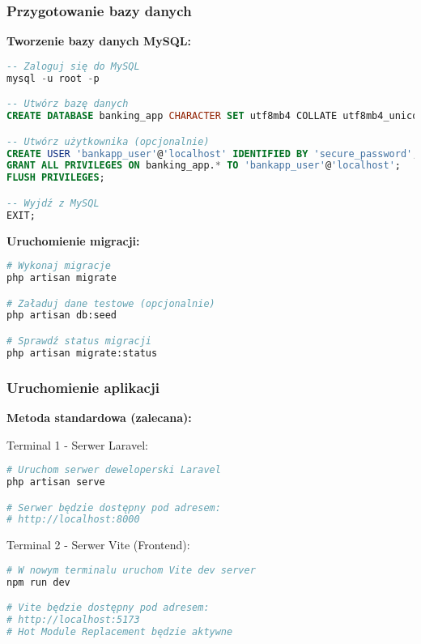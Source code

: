 \documentclass[12pt,a4paper]{article}
\begin{document}
    \subsubsection{Przygotowanie bazy danych}

    \textbf{Tworzenie bazy danych MySQL:}
    \begin{lstlisting}[language=sql, caption=SQL dla tworzenia bazy danych]
-- Zaloguj się do MySQL
mysql -u root -p

-- Utwórz bazę danych
CREATE DATABASE banking_app CHARACTER SET utf8mb4 COLLATE utf8mb4_unicode_ci;

-- Utwórz użytkownika (opcjonalnie)
CREATE USER 'bankapp_user'@'localhost' IDENTIFIED BY 'secure_password';
GRANT ALL PRIVILEGES ON banking_app.* TO 'bankapp_user'@'localhost';
FLUSH PRIVILEGES;

-- Wyjdź z MySQL
EXIT;
    \end{lstlisting}

    \textbf{Uruchomienie migracji:}
    \begin{lstlisting}[language=bash, caption=Migracje bazy danych]
# Wykonaj migracje
php artisan migrate

# Załaduj dane testowe (opcjonalnie)
php artisan db:seed

# Sprawdź status migracji
php artisan migrate:status
    \end{lstlisting}

    \subsubsection{Uruchomienie aplikacji}

    \textbf{Metoda standardowa (zalecana):}

    Terminal 1 - Serwer Laravel:
    \begin{lstlisting}[language=bash, caption=Uruchomienie serwera Laravel]
# Uruchom serwer deweloperski Laravel
php artisan serve

# Serwer będzie dostępny pod adresem:
# http://localhost:8000
    \end{lstlisting}

    Terminal 2 - Serwer Vite (Frontend):
    \begin{lstlisting}[language=bash, caption=Uruchomienie serwera Vite]
# W nowym terminalu uruchom Vite dev server
npm run dev

# Vite będzie dostępny pod adresem:
# http://localhost:5173
# Hot Module Replacement będzie aktywne
    \end{lstlisting}
\end{document}
